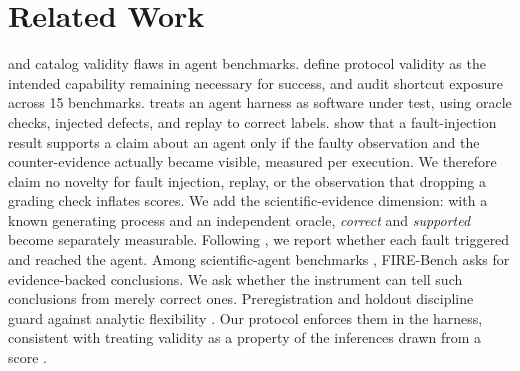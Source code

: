 \section{Related Work}
\label{sec:related}
\citet{kapoor2024agents} and \citet{zhu2025abc} catalog validity flaws in
agent benchmarks. \citet{shao2026protocol} define protocol validity as the
intended capability remaining necessary for success, and audit shortcut
exposure across 15 benchmarks. \citet{chen2026unreliable} treats an agent
harness as software under test, using oracle checks, injected defects, and
replay to correct labels. \citet{he2026sscbench} show that a fault-injection
result supports a claim about an agent only if the faulty observation and the
counter-evidence actually became visible, measured per execution. We
therefore claim no novelty for fault injection, replay, or the observation
that dropping a grading check inflates scores. We add the scientific-evidence
dimension: with a known generating process and an independent oracle,
\emph{correct} and \emph{supported} become separately measurable. Following
\citet{he2026sscbench}, we report whether each fault triggered and reached the
agent. Among scientific-agent benchmarks
\citep{chan2025mlebench,starace2025paperbench,siegel2024corebench},
FIRE-Bench \citep{wang2026firebench} asks for evidence-backed conclusions. We
ask whether the instrument can tell such conclusions from merely correct ones.
Preregistration and holdout discipline
\citep{nosek2018preregistration,dwork2015reusable} guard against analytic
flexibility \citep{simmons2011false,gelman2014statistical}. Our protocol
enforces them in the harness, consistent with treating validity as a property
of the inferences drawn from a score \citep{messick1995validity}.
